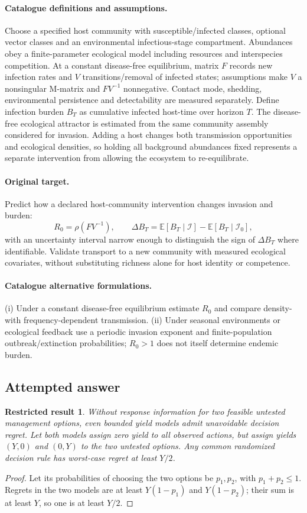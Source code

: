 \documentclass[11pt]{article}
\newcommand{\E}{\mathbb E}
\providecommand{\E}{\mathbb E}
\newtheorem{attemptresult}{Restricted result}[section]
\begin{document}
\paragraph{Catalogue definitions and assumptions.}
Choose a specified host community with susceptible/infected classes, optional vector classes and an environmental infectious-stage compartment. Abundances obey a finite-parameter ecological model including resources and interspecies competition. At a constant disease-free equilibrium, matrix $F$ records new infection rates and $V$ transitions/removal of infected states; assumptions make $V$ a nonsingular M-matrix and $FV^{-1}$ nonnegative. Contact mode, shedding, environmental persistence and detectability are measured separately. Define infection burden $B_T$ as cumulative infected host-time over horizon $T$. The disease-free ecological attractor is estimated from the same community assembly considered for invasion. Adding a host changes both transmission opportunities and ecological densities, so holding all background abundances fixed represents a separate intervention from allowing the ecosystem to re-equilibrate.
\paragraph{Original target.}
Predict how a declared host-community intervention changes invasion and burden:
\[
 R_0=\rho(FV^{-1}),\qquad
 \Delta B_T=\E[B_T\mid\mathcal I]-\E[B_T\mid\mathcal I_0],
\]
with an uncertainty interval narrow enough to distinguish the sign of $\Delta B_T$ where identifiable. Validate transport to a new community with measured ecological covariates, without substituting richness alone for host identity or competence.
\paragraph{Catalogue alternative formulations.}
(i) Under a constant disease-free equilibrium estimate $R_0$ and compare density- with frequency-dependent transmission. (ii) Under seasonal environments or ecological feedback use a periodic invasion exponent and finite-population outbreak/extinction probabilities; $R_0>1$ does not itself determine endemic burden.
\subsection{Attempted answer}
\begin{attemptresult}
Without response information for two feasible untested management options, even bounded yield models admit unavoidable decision regret. Let both models assign zero yield to all observed actions, but assign yields $(Y,0)$ and $(0,Y)$ to the two untested options. Any common randomized decision rule has worst-case regret at least $Y/2$.
\end{attemptresult}
\begin{proof}
Let its probabilities of choosing the two options be $p_1,p_2$, with $p_1+p_2\leq1$. Regrets in the two models are at least $Y(1-p_1)$ and $Y(1-p_2)$; their sum is at least $Y$, so one is at least $Y/2$.
\end{proof}
\end{document}
